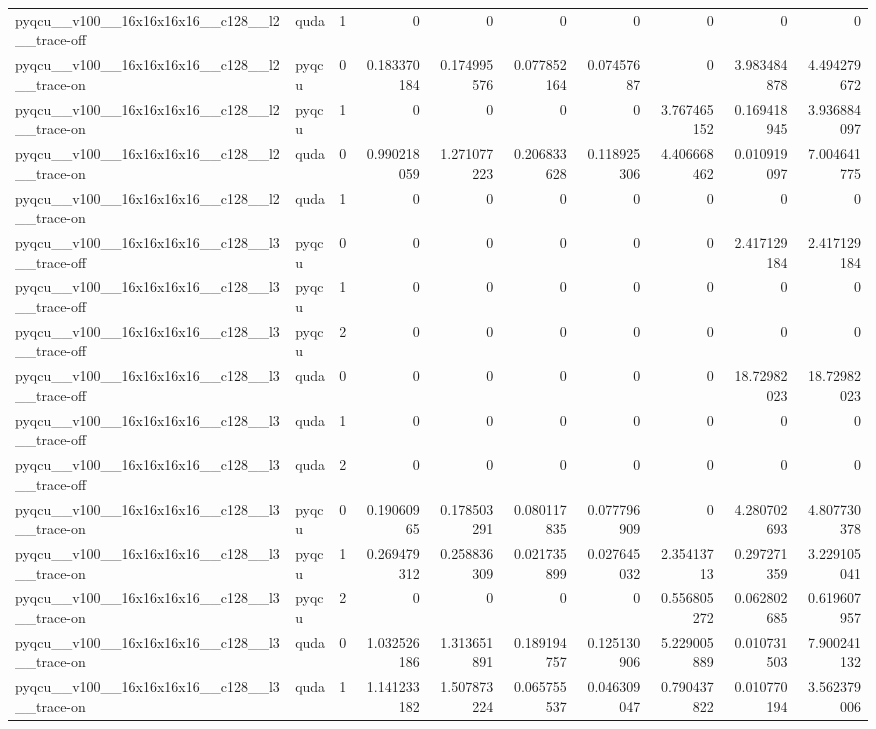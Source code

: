 \begin{table}[htbp]
\begin{tabular}{@{}llrrrrrrrr@{}}
pyqcu\_\_v100\_\_16x16x16x16\_\_c128\_\_l2\_\_trace-off & quda & 1 & 0 & 0 & 0 & 0 & 0 & 0 & 0 \\
pyqcu\_\_v100\_\_16x16x16x16\_\_c128\_\_l2\_\_trace-on & pyqcu & 0 & 0.183370184 & 0.174995576 & 0.077852164 & 0.07457687 & 0 & 3.983484878 & 4.494279672 \\
pyqcu\_\_v100\_\_16x16x16x16\_\_c128\_\_l2\_\_trace-on & pyqcu & 1 & 0 & 0 & 0 & 0 & 3.767465152 & 0.169418945 & 3.936884097 \\
pyqcu\_\_v100\_\_16x16x16x16\_\_c128\_\_l2\_\_trace-on & quda & 0 & 0.990218059 & 1.271077223 & 0.206833628 & 0.118925306 & 4.406668462 & 0.010919097 & 7.004641775 \\
pyqcu\_\_v100\_\_16x16x16x16\_\_c128\_\_l2\_\_trace-on & quda & 1 & 0 & 0 & 0 & 0 & 0 & 0 & 0 \\
pyqcu\_\_v100\_\_16x16x16x16\_\_c128\_\_l3\_\_trace-off & pyqcu & 0 & 0 & 0 & 0 & 0 & 0 & 2.417129184 & 2.417129184 \\
pyqcu\_\_v100\_\_16x16x16x16\_\_c128\_\_l3\_\_trace-off & pyqcu & 1 & 0 & 0 & 0 & 0 & 0 & 0 & 0 \\
pyqcu\_\_v100\_\_16x16x16x16\_\_c128\_\_l3\_\_trace-off & pyqcu & 2 & 0 & 0 & 0 & 0 & 0 & 0 & 0 \\
pyqcu\_\_v100\_\_16x16x16x16\_\_c128\_\_l3\_\_trace-off & quda & 0 & 0 & 0 & 0 & 0 & 0 & 18.72982023 & 18.72982023 \\
pyqcu\_\_v100\_\_16x16x16x16\_\_c128\_\_l3\_\_trace-off & quda & 1 & 0 & 0 & 0 & 0 & 0 & 0 & 0 \\
pyqcu\_\_v100\_\_16x16x16x16\_\_c128\_\_l3\_\_trace-off & quda & 2 & 0 & 0 & 0 & 0 & 0 & 0 & 0 \\
pyqcu\_\_v100\_\_16x16x16x16\_\_c128\_\_l3\_\_trace-on & pyqcu & 0 & 0.19060965 & 0.178503291 & 0.080117835 & 0.077796909 & 0 & 4.280702693 & 4.807730378 \\
pyqcu\_\_v100\_\_16x16x16x16\_\_c128\_\_l3\_\_trace-on & pyqcu & 1 & 0.269479312 & 0.258836309 & 0.021735899 & 0.027645032 & 2.35413713 & 0.297271359 & 3.229105041 \\
pyqcu\_\_v100\_\_16x16x16x16\_\_c128\_\_l3\_\_trace-on & pyqcu & 2 & 0 & 0 & 0 & 0 & 0.556805272 & 0.062802685 & 0.619607957 \\
pyqcu\_\_v100\_\_16x16x16x16\_\_c128\_\_l3\_\_trace-on & quda & 0 & 1.032526186 & 1.313651891 & 0.189194757 & 0.125130906 & 5.229005889 & 0.010731503 & 7.900241132 \\
pyqcu\_\_v100\_\_16x16x16x16\_\_c128\_\_l3\_\_trace-on & quda & 1 & 1.141233182 & 1.507873224 & 0.065755537 & 0.046309047 & 0.790437822 & 0.010770194 & 3.562379006 \\

\end{tabular}
\end{table}
